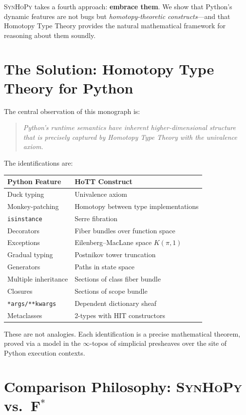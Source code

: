 \documentclass[11pt,a4paper]{report}
\theoremstyle{definition}
\theoremstyle{plain}
\newcommand{\fstar}{F$^{*}$}
\newcommand{\synhopy}{\textsc{SynHoPy}}
\begin{document}
\synhopy{} takes a fourth approach: \textbf{embrace them}. We show that Python's
dynamic features are not bugs but \emph{homotopy-theoretic constructs}---and
that Homotopy Type Theory provides the natural mathematical framework for
reasoning about them soundly.

\section{The Solution: Homotopy Type Theory for Python}

The central observation of this monograph is:

\begin{quote}
\itshape
Python's runtime semantics have inherent higher-dimensional structure that
is precisely captured by Homotopy Type Theory with the univalence axiom.
\end{quote}

The identifications are:

\begin{center}
\begin{tabular}{ll}
\toprule
\textbf{Python Feature} & \textbf{HoTT Construct} \\
\midrule
Duck typing & Univalence axiom \\
Monkey-patching & Homotopy between type implementations \\
\texttt{isinstance} & Serre fibration \\
Decorators & Fiber bundles over function space \\
Exceptions & Eilenberg--MacLane space $K(\pi, 1)$ \\
Gradual typing & Postnikov tower truncation \\
Generators & Paths in state space \\
Multiple inheritance & Sections of class fiber bundle \\
Closures & Sections of scope bundle \\
\texttt{*args/**kwargs} & Dependent dictionary sheaf \\
Metaclasses & 2-types with HIT constructors \\
\bottomrule
\end{tabular}
\end{center}

These are not analogies. Each identification is a precise mathematical theorem,
proved via a model in the $\infty$-topos of simplicial presheaves over the site
of Python execution contexts.

\section{Comparison Philosophy: \synhopy{} vs.\ \fstar{}}
\end{document}
